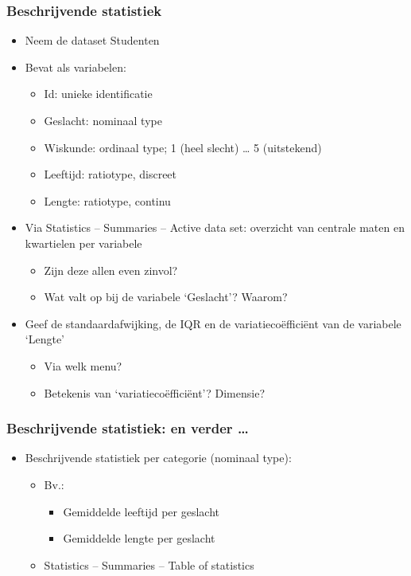 \documentclass{beamer}
\begin{document}
\begin{frame}
  \frametitle{Beschrijvende statistiek}
  \begin{itemize}
    \item Neem de dataset Studenten
    \item Bevat als variabelen:
      \begin{itemize}
        \item Id: unieke identificatie
        \item Geslacht: nominaal type
        \item Wiskunde: ordinaal type; 1 (heel slecht) … 5 (uitstekend)
        \item Leeftijd: ratiotype, discreet
        \item Lengte: ratiotype, continu
      \end{itemize}
    \item Via Statistics -- Summaries -- Active data set: overzicht van centrale maten en kwartielen per variabele
      \begin{itemize}
        \item Zijn deze allen even zinvol?
        \item Wat valt op bij de variabele ‘Geslacht’?  Waarom?
      \end{itemize}
    \item Geef de standaardafwijking, de IQR en de variatiecoëfficiënt van de variabele ‘Lengte’
      \begin{itemize}
        \item Via welk menu?
        \item Betekenis van ‘variatiecoëfficiënt'? Dimensie?
      \end{itemize}
  \end{itemize}
\end{frame}

\begin{frame}
  \frametitle{Beschrijvende statistiek: en verder \ldots}
  \begin{itemize}
    \item Beschrijvende statistiek per categorie (nominaal type):
      \begin{itemize}
        \item Bv.:
          \begin{itemize}
            \item Gemiddelde leeftijd per geslacht
            \item Gemiddelde lengte per geslacht
          \end{itemize}
        \item Statistics -- Summaries -- Table of statistics
      \end{itemize}
  \end{itemize}

\end{frame}
\end{document}
